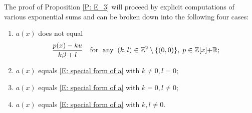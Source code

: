 \documentclass[11pt]{amsart}
\newtheorem{lemma}{Lemma}[section]
\theoremstyle{definition}
\newcommand{\R}{{\mathbb R}}
\newcommand{\Z}{{\mathbb Z}}
\newcommand{\1}{{\mathbf{1}}}
\newcommand{\brac}[1]{\mathopen{}\left( #1 \mathclose{}\right)}
\newcommand{\floor}[1]{{\left \lfloor #1 \right \rfloor}}
\begin{document}
The proof of Proposition \ref{P: E_3} will proceed by explicit computations of various exponential sums and can be broken down into the following four cases:
\begin{enumerate}
    \item $a(x)$ does not equal
    \begin{align}\label{E: special form of a}
        \frac{p(x)-ku}{k\beta + l} \quad \textrm{for\; any}\;\; (k, l)\in\Z^2\setminus{\{(0,0)\}},\; p\in\Z[x]{+\R}; %
    \end{align}
    \item $a(x)$ equals \eqref{E: special form of a} with $k\neq 0, l=0$;
    \item $a(x)$ equals \eqref{E: special form of a} with $k=0, l\neq 0$;
    \item $a(x)$ equals \eqref{E: special form of a} with $k, l\neq 0$.
\end{enumerate}
\end{document}
